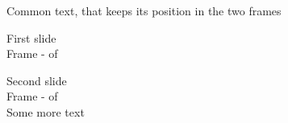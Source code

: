 \documentclass{beamer}
\begin{document}
\begin{frame}
Common text, that keeps its position in the two frames \\

\begin{overprint}

  First slide \\
  Frame - \insertframenumber{} of \inserttotalframenumber \\


  Second slide \\
  Frame - \insertframenumber{} of \inserttotalframenumber \\
  Some more text

\end{overprint}
\end{frame}
\end{document}
